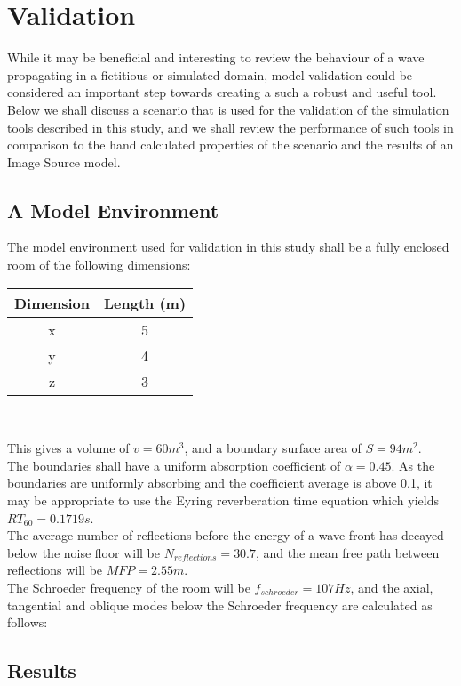 %
%
%
\chapter{Validation}
\label{Introduction}
While it may be beneficial and interesting to review the behaviour of a wave propagating in a fictitious or simulated domain, model validation could be considered an important step towards creating a such a robust and useful tool. Below we shall discuss a scenario that is used for the validation of the simulation tools described in this study, and we shall review the performance of such tools in comparison to the hand calculated properties of the scenario and the results of an Image Source model.  

\section{A Model Environment}
The model environment used for validation in this study shall be a fully enclosed room of the following dimensions:\\

\begin{center}
\begin{tabular}{|c|c|} 
  \hline
 Dimension & Length (m) \\
 \hline
 x & 5 \\ 
 y & 4 \\  
 z & 3 \\  
 \hline
\end{tabular}\\
\end{center}

This gives a volume of $ v = 60m^3$, and a boundary surface area of $S = 94m^2$.\\
The boundaries shall have a uniform absorption coefficient of $\alpha = 0.45 $. As the boundaries are uniformly absorbing and the coefficient average is above 0.1, it may be appropriate to use the Eyring reverberation time equation which yields $RT_{60} = 0.1719s $.\\
The average number of reflections before the energy of a wave-front has decayed below the noise floor will be $N_{reflections} = 30.7$, and the mean free path between reflections will be $MFP = 2.55m$.\\
The Schroeder frequency of the room will be $f_{schroeder} = 107Hz $, and the axial, tangential and oblique modes below the Schroeder frequency are calculated as follows:\\

\section{Results}





